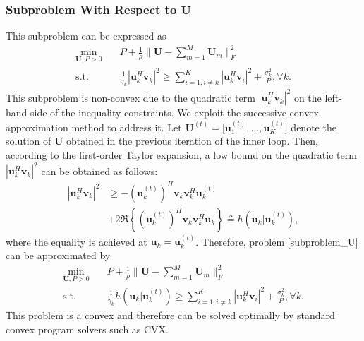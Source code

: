\subsubsection{Subproblem With Respect to $\mathbf{U}$} This subproblem can be expressed as 
\begin{subequations} \label{subproblem_U}
    \begin{align}
        \min_{\mathbf{U}, P > 0} \quad &P + \frac{1}{\rho} \| \mathbf{U} - \sum_{m=1}^M \mathbf{U}_m \|_F^2 \\
        \mathrm{s.t.} \quad & \frac{1}{\gamma_k}\left| \mathbf{u}_k^H \mathbf{v}_k \right|^2 \ge \sum_{i=1, i \neq k}^K  \left| \mathbf{u}_k^H \mathbf{v}_i \right|^2 + \frac{\sigma_k^2}{P}, \forall k.
    \end{align}
\end{subequations}
This subproblem is non-convex due to the quadratic term $\left| \mathbf{u}_k^H \mathbf{v}_k \right|^2$ on the left-hand side of the inequality constraints. We exploit the successive convex approximation method to address it. Let $\mathbf{U}^{(t)} = \big[\mathbf{u}_1^{(t)},\dots,\mathbf{u}_K^{(t)}\big]$ denote the solution of $\mathbf{U}$ obtained in the previous iteration of the inner loop. Then, according to the first-order Taylor expansion, a low bound on the quadratic term $\left| \mathbf{u}_k^H \mathbf{v}_k \right|^2$ can be obtained as follows:
\begin{align}
    \left| \mathbf{u}_k^H \mathbf{v}_k \right|^2 &\ge - \left( \mathbf{u}_k^{(t)}\right)^H \mathbf{v}_k \mathbf{v}_k^H \mathbf{u}_k^{(t)} \nonumber \\
    &+ 2 \Re \left\{ \left( \mathbf{u}_k^{(t)}\right)^H \mathbf{v}_k \mathbf{v}_k^H \mathbf{u}_k \right\} \triangleq h \left( \mathbf{u}_k | \mathbf{u}_k^{(t)} \right),
\end{align} 
where the equality is achieved at $\mathbf{u}_k = \mathbf{u}_k^{(t)}$. Therefore, problem \eqref{subproblem_U} can be approximated by 
\begin{subequations} \label{subproblem_U_sca}
    \begin{align}
        \min_{\mathbf{U}, P > 0} \quad & P + \frac{1}{\rho} \|\mathbf{U} - \sum_{m=1}^M \mathbf{U}_m \|_F^2  \\
        \mathrm{s.t.} \quad & \frac{1}{\gamma_k} h \left( \mathbf{u}_k | \mathbf{u}_k^{(t)} \right) \ge \sum_{i = 1, i \neq k}^K \left| \mathbf{u}_k^H \mathbf{v}_i \right|^2 + \frac{\sigma_k^2}{P}, \forall k.
    \end{align}
\end{subequations}
This problem is a convex and therefore can be solved optimally by standard convex program solvers such as CVX.

